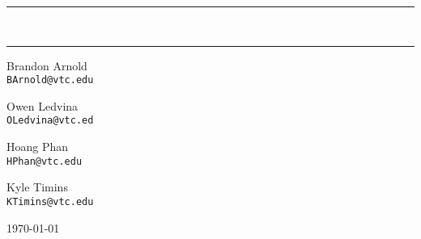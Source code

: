 \begin{titlepage}
  \begin{center}
    \textsc{\LARGE \class}
    \vspace{1.5 cm}

    \textsc{\Large \docTitle}
    \vspace{0.5 cm}

    \hrule \vspace{0.4 cm}
    { \Huge \bfseries \theTitle}\\\vspace{0.4 cm}
    { \huge \bfseries \subTitle}\vspace{0.4 cm}
    \hrule \vspace{1.5 cm}

    \begin{minipage}{0.4\textwidth}
    \begin{flushleft} {\large
        \begin{center}
       Brandon Arnold\\
       		\texttt{BArnold@vtc.edu}
       		
       Owen Ledvina\\
       		\texttt{OLedvina@vtc.ed}

        \end{center} }
        \end{flushleft}
        \end{minipage}
        \begin{minipage}{0.4\textwidth}
        \begin{flushright} { \large
            \begin{center}
            Hoang Phan\\
                \texttt{HPhan@vtc.edu}

            Kyle Timins\\
                \texttt{KTimins@vtc.edu}
            \end{center} }
        \end{flushright}
    \end{minipage}

            \vfill

    {\large \today}

\end{center}

\end{titlepage}
